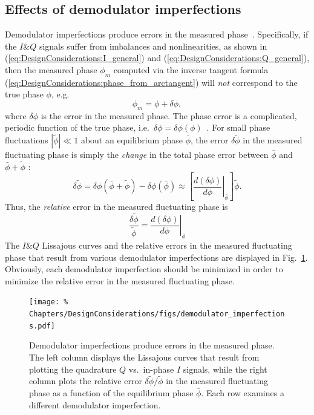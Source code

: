 \subsection{Effects of demodulator imperfections}
\label{sec:DesignConsiderations:demodulation:imperfection_implications}
Demodulator imperfections produce errors
in the measured phase~\cite{vanzeeland_rsi04,kasten_masters}.
Specifically, if the $I\&Q$ signals suffer from imbalances and nonlinearities,
as shown in (\ref{eq:DesignConsiderations:I_general}) and
(\ref{eq:DesignConsiderations:Q_general}),
then the measured phase $\phi_m$ computed via the inverse tangent formula
(\ref{eq:DesignConsiderations:phase_from_arctangent})
will \emph{not} correspond to the true phase $\phi$, e.g.\
\begin{equation}
  \phi_m = \phi + \delta \phi,
\end{equation}
where $\delta\phi$ is the error in the measured phase.
The phase error is a complicated, periodic function of the true phase,
i.e.\ $\delta\phi = \delta\phi(\phi)$~\cite{vanzeeland_rsi04}.
For small phase fluctuations $|\tilde{\phi}| \ll 1$
about an equilibrium phase $\bar{\phi}$,
the error $\delta\tilde{\phi}$ in the measured fluctuating phase
is simply the \emph{change} in the total phase error
between $\bar{\phi}$ and $\bar{\phi} + \tilde{\phi}$
\cite{kasten_masters}:
\begin{equation}
  \delta\tilde{\phi}
  =
  \delta\phi(\bar{\phi} + \tilde{\phi}) - \delta\phi(\bar{\phi})
  \approx
  \left[%
    \left. \frac{d(\delta\phi)}{d\phi} \right|_{\bar{\phi}}
  \right] \tilde{\phi}.
\end{equation}
Thus, the \emph{relative} error in the measured fluctuating phase is
\begin{equation}
  \frac{\delta\tilde{\phi}}{\tilde{\phi}}
  =
  \left. \frac{d(\delta\phi)}{d\phi} \right|_{\bar{\phi}}
  \label{eq:DesignConsiderations:relative_fluctuation_error}
\end{equation}
The $I\&Q$ Lissajous curves and
the relative errors in the measured fluctuating phase
that result from various demodulator imperfections
are displayed in
Fig.~\ref{fig:DesignConsiderations:effects_of_demodulator_imperfections}.
Obviously, each demodulator imperfection should be minimized
in order to minimize the relative error
in the measured fluctuating phase.

\begin{figure}
  \centering
  \texttt{[image: \%
    Chapters/DesignConsiderations/figs/demodulator\_imperfections.pdf]}
  \caption[Effects of demodulator imperfections]{%
    Demodulator imperfections produce errors in the measured phase.
    The left column displays the Lissajous curves
    that result from plotting
    the quadrature $Q$ vs.\ in-phase $I$ signals, while
    the right column plots the relative error
    $\delta\tilde{\phi} / \tilde{\phi}$
    in the measured fluctuating phase
    as a function of the equilibrium phase $\bar{\phi}$.
    Each row examines a different demodulator imperfection.
  }
  \label{fig:DesignConsiderations:effects_of_demodulator_imperfections}
\end{figure}


